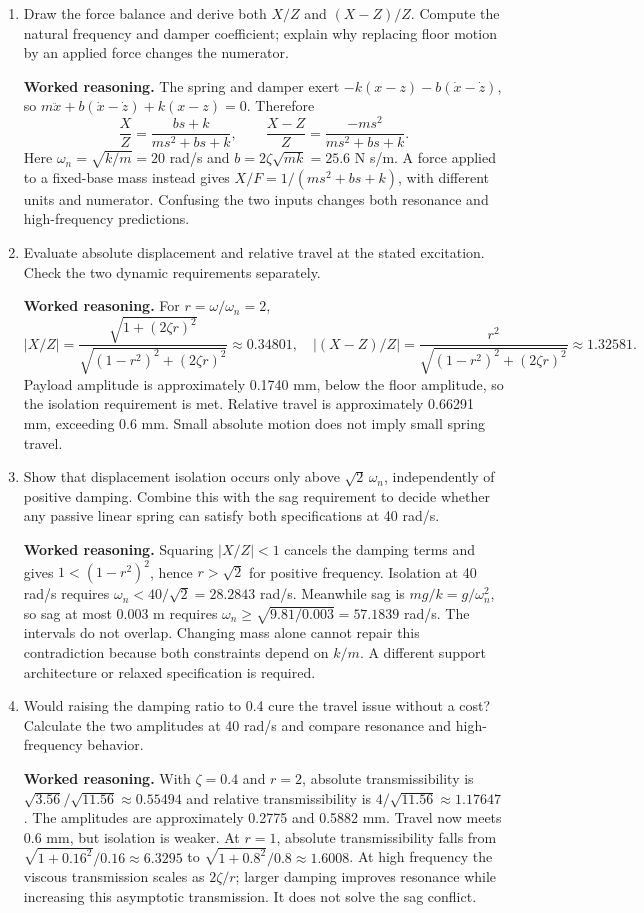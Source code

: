\documentclass[10pt,a4paper]{article}
\newcommand{\answer}{\par\smallskip\textbf{Worked reasoning.} }
\begin{document}
\begin{enumerate}
\item Draw the force balance and derive both $X/Z$ and $(X-Z)/Z$. Compute the natural frequency and damper coefficient; explain why replacing floor motion by an applied force changes the numerator.
\answer The spring and damper exert $-k(x-z)-b(\dot x-\dot z)$, so $m\ddot x+b(\dot x-\dot z)+k(x-z)=0$. Therefore
\[
\frac{X}{Z}=\frac{bs+k}{ms^2+bs+k},\qquad
\frac{X-Z}{Z}=\frac{-ms^2}{ms^2+bs+k}.
\]
Here $\omega_n=\sqrt{k/m}=20$ rad/s and $b=2\zeta\sqrt{mk}=25.6$ N s/m. A force applied to a fixed-base mass instead gives $X/F=1/(ms^2+bs+k)$, with different units and numerator. Confusing the two inputs changes both resonance and high-frequency predictions.
\item Evaluate absolute displacement and relative travel at the stated excitation. Check the two dynamic requirements separately.
\answer For $r=\omega/\omega_n=2$,
\[
|X/Z|=\frac{\sqrt{1+(2\zeta r)^2}}{\sqrt{(1-r^2)^2+(2\zeta r)^2}}\approx0.34801,
\quad |(X-Z)/Z|=\frac{r^2}{\sqrt{(1-r^2)^2+(2\zeta r)^2}}\approx1.32581.
\]
Payload amplitude is approximately 0.1740 mm, below the floor amplitude, so the isolation requirement is met. Relative travel is approximately 0.66291 mm, exceeding 0.6 mm. Small absolute motion does not imply small spring travel.
\item Show that displacement isolation occurs only above $\sqrt2\,\omega_n$, independently of positive damping. Combine this with the sag requirement to decide whether any passive linear spring can satisfy both specifications at 40 rad/s.
\answer Squaring $|X/Z|<1$ cancels the damping terms and gives $1<(1-r^2)^2$, hence $r>\sqrt2$ for positive frequency. Isolation at 40 rad/s requires $\omega_n<40/\sqrt2=28.2843$ rad/s. Meanwhile sag is $mg/k=g/\omega_n^2$, so sag at most 0.003 m requires $\omega_n\ge\sqrt{9.81/0.003}=57.1839$ rad/s. The intervals do not overlap. Changing mass alone cannot repair this contradiction because both constraints depend on $k/m$. A different support architecture or relaxed specification is required.
\item Would raising the damping ratio to 0.4 cure the travel issue without a cost? Calculate the two amplitudes at 40 rad/s and compare resonance and high-frequency behavior.
\answer With $\zeta=0.4$ and $r=2$, absolute transmissibility is $\sqrt{3.56}/\sqrt{11.56}\approx0.55494$ and relative transmissibility is $4/\sqrt{11.56}\approx1.17647$. The amplitudes are approximately 0.2775 and 0.5882 mm. Travel now meets 0.6 mm, but isolation is weaker. At $r=1$, absolute transmissibility falls from $\sqrt{1+0.16^2}/0.16\approx6.3295$ to $\sqrt{1+0.8^2}/0.8\approx1.6008$. At high frequency the viscous transmission scales as $2\zeta/r$; larger damping improves resonance while increasing this asymptotic transmission. It does not solve the sag conflict.

\end{enumerate}
\end{document}
